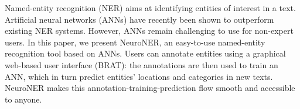 Named-entity recognition (NER) aims at identifying entities of interest in a text. Artificial neural networks (ANNs) have recently been shown to outperform existing NER systems. However, ANNs remain challenging to use for non-expert users. In this paper, we present NeuroNER, an easy-to-use named-entity recognition tool based on ANNs.  Users can annotate entities using a graphical web-based user interface (BRAT): the annotations are then used to train an ANN, which in turn predict entities' locations and categories in new texts. NeuroNER makes this annotation-training-prediction flow smooth and accessible to anyone.
